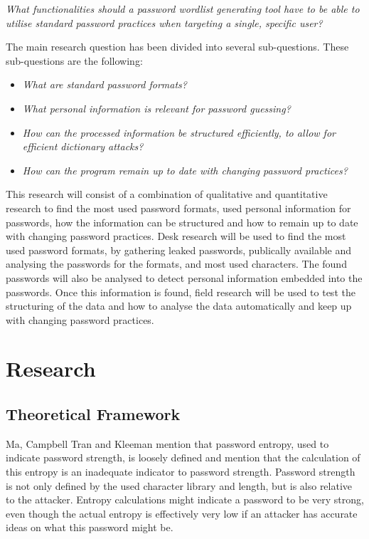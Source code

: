 \documentclass[a4paper,12pt]{article}
\begin{document}
\textit{What functionalities should a password wordlist generating tool have to be able to utilise standard password practices when targeting a single, specific user?}

The main research question has been divided into several sub-questions. These sub-questions are the following:

\begin{itemize}
\item \textit{What are standard password formats?}
\item \textit{What personal information is relevant for password guessing?}
\item \textit{How can the processed information be structured efficiently, to allow for efficient dictionary attacks?}
\item \textit{How can the program remain up to date with changing password practices?}
\end{itemize}

This research will consist of a combination of qualitative and quantitative research to find the most used password formats, used personal information for passwords, how the information can be structured and how to remain up to date with changing password practices. Desk research will be used to find the most used password formats, by gathering leaked passwords, publically available and analysing the passwords for the formats, and most used characters. The found passwords will also be analysed to detect personal information embedded into the passwords. Once this information is found, field research will be used to test the structuring of the data and how to analyse the data automatically and keep up with changing password practices.

\newpage
\section{Research}

\subsection{Theoretical Framework}
Ma, Campbell Tran and Kleeman \cite{bib:entro} mention that password entropy, used to indicate password strength, is loosely defined and mention that the calculation of this entropy is an inadequate indicator to password strength. Password strength is not only defined by the used character library and length, but is also relative to the attacker. Entropy calculations might indicate a password to be very strong, even though the actual entropy is effectively very low if an attacker has accurate ideas on what this password might be.\\
\end{document}
